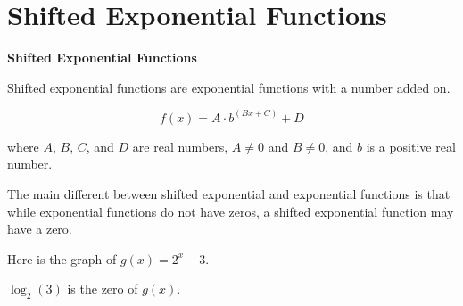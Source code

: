 \documentclass{ximera}
\begin{document}
\section*{Shifted Exponential Functions}


\begin{definition} \textbf{\textcolor{green!50!black}{Shifted Exponential Functions}}

Shifted exponential functions are exponential functions with a number added on.


\[      f(x) = A \cdot b^(B x + C) + D   \]

where $A$, $B$, $C$, and $D$ are real numbers, $A \ne 0$ and $B \ne 0$, and $b$ is a positive real number.


\end{definition}




The main different between shifted exponential and exponential functions is that while exponential functions do not have zeros, a shifted exponential function may have a zero. \\







\begin{example}

Here is the graph of $g(x) = 2^x - 3$.

\begin{image}
\end{image}


$\log_2(3)$ is the zero of $g(x)$.



\end{example}
\end{document}
